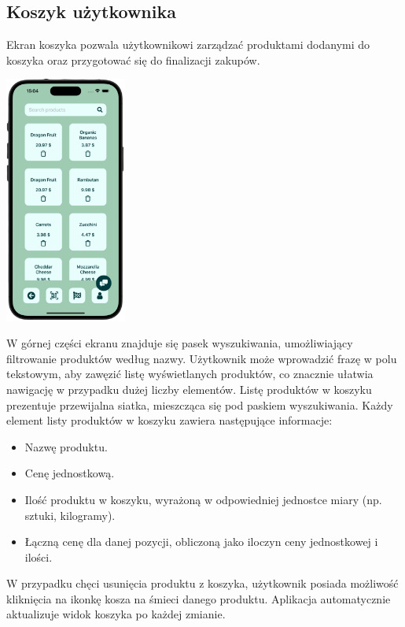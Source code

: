 \subsection{Koszyk użytkownika}

Ekran koszyka pozwala użytkownikowi zarządzać produktami dodanymi do koszyka oraz przygotować się do finalizacji zakupów. 

\begin{center}
    \includegraphics[width=0.3\textwidth]{images/front/cart_page.png}
\end{center}

W górnej części ekranu znajduje się pasek wyszukiwania, umożliwiający filtrowanie produktów według nazwy. Użytkownik może wprowadzić frazę w polu tekstowym, aby zawęzić listę wyświetlanych produktów, co znacznie ułatwia nawigację w przypadku dużej liczby elementów. Listę produktów w koszyku prezentuje przewijalna siatka, mieszcząca się pod paskiem wyszukiwania. Każdy element listy produktów w koszyku zawiera następujące informacje:
\begin{itemize}
    \item Nazwę produktu.
    \item Cenę jednostkową.
    \item Ilość produktu w koszyku, wyrażoną w odpowiedniej jednostce miary (np. sztuki, kilogramy).
    \item Łączną cenę dla danej pozycji, obliczoną jako iloczyn ceny jednostkowej i ilości.
\end{itemize}

W przypadku chęci usunięcia produktu z koszyka, użytkownik posiada możliwość kliknięcia na ikonkę kosza na śmieci danego produktu. Aplikacja automatycznie aktualizuje widok koszyka po każdej zmianie.

